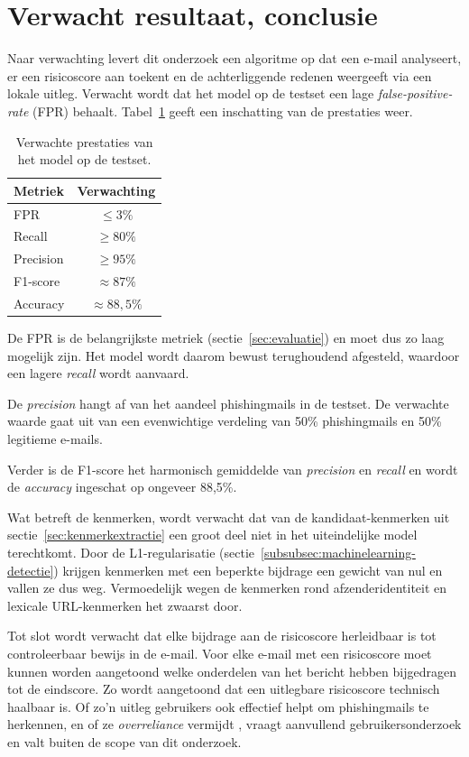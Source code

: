 \section{Verwacht resultaat, conclusie}%
\label{sec:verwachte_resultaten}

Naar verwachting levert dit onderzoek een algoritme op dat een e-mail analyseert, er een risicoscore aan toekent en de achterliggende redenen weergeeft via een lokale uitleg. Verwacht wordt dat het model op de testset een lage \emph{false-positive-rate} (FPR) behaalt. Tabel~\ref{tab:verwachte_resultaten} geeft een inschatting van de  prestaties weer.

\begin{table}[htbp]
  \centering
  \begin{tabular}{lc}
    \toprule
    \textbf{Metriek} & \textbf{Verwachting} \\
    \midrule
    FPR       & $\leqslant 3\%$ \\
    Recall    & $\geqslant 80\%$ \\
    Precision & $\geqslant 95\%$ \\
    F1-score  & $\approx 87\%$ \\
    Accuracy  & $\approx 88,5\%$ \\
    \bottomrule
  \end{tabular}
  \caption{Verwachte prestaties van het model op de testset.}
  \label{tab:verwachte_resultaten}
\end{table}

De FPR is de belangrijkste metriek (sectie~\ref{sec:evaluatie}) en moet dus zo laag mogelijk zijn. Het model wordt daarom bewust terughoudend afgesteld, waardoor een lagere \emph{recall} wordt aanvaard.

De \emph{precision} hangt af van het aandeel phishingmails in de testset. De verwachte waarde gaat uit van een evenwichtige verdeling van 50\% phishingmails en 50\% legitieme e-mails.

Verder is de F1-score het harmonisch gemiddelde van \emph{precision} en \emph{recall} en wordt de \emph{accuracy} ingeschat op ongeveer 88,5\%.

Wat betreft de kenmerken, wordt verwacht dat van de kandidaat-kenmerken uit sectie~\ref{sec:kenmerkextractie} een groot deel niet in het uiteindelijke model terechtkomt. Door de L1-regularisatie (sectie~\ref{subsubsec:machinelearning-detectie}) krijgen kenmerken met een beperkte bijdrage een gewicht van nul en vallen ze dus weg. Vermoedelijk wegen de kenmerken rond afzenderidentiteit en lexicale URL-kenmerken het zwaarst door.

Tot slot wordt verwacht dat elke bijdrage aan de risicoscore herleidbaar is tot controleerbaar bewijs in de e-mail. Voor elke e-mail met een risicoscore moet kunnen worden aangetoond welke onderdelen van het bericht hebben bijgedragen tot de eindscore. Zo wordt aangetoond dat een uitlegbare risicoscore technisch haalbaar is. Of zo'n uitleg gebruikers ook effectief helpt om phishingmails te herkennen, en of ze \emph{overreliance} vermijdt \autocite{Bucinca2021}, vraagt aanvullend gebruikersonderzoek en valt buiten de scope van dit onderzoek.